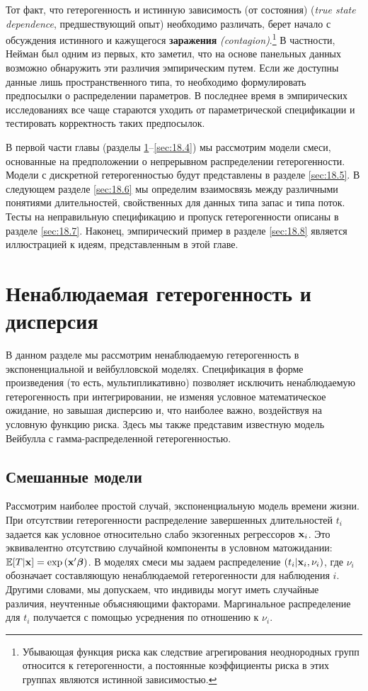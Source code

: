 Тот факт, что гетерогенность и истинную зависимость (от состояния) (\textit{true state dependence}, предшествующий опыт) необходимо различать, берет начало с обсуждения истинного и кажущегося \textbf{заражения} \textit{(contagion)}.\footnote{Убывающая функция риска как следствие агрегирования неоднородных групп относится к гетерогенности, а постоянные коэффициенты риска в этих группах являются истинной зависимостью.} В частности, Нейман был одним из первых, кто заметил, что на основе панельных данных возможно обнаружить эти различия эмпирическим путем. Если же доступны данные лишь пространственного типа, то необходимо формулировать предпосылки о распределении параметров. В последнее время в эмпирических исследованиях все чаще стараются уходить от параметрической спецификации и тестировать корректность таких предпосылок.

В первой части главы (разделы \ref{sec:18.2}--\ref{sec:18.4}) мы рассмотрим модели смеси, основанные на предположении о непрерывном распределении гетерогенности. Модели с дискретной гетерогенностью будут представлены в разделе \ref{sec:18.5}. В следующем разделе \ref{sec:18.6} мы определим взаимосвязь между различными понятиями длительностей, свойственных для данных типа запас и типа поток. Тесты на неправильную спецификацию и пропуск гетерогенности описаны в разделе \ref{sec:18.7}. Наконец, эмпирический пример в разделе \ref{sec:18.8} является иллюстрацией к идеям, представленным в этой главе.




\section{Ненаблюдаемая гетерогенность и дисперсия}
\label{sec:18.2}

\noindent
В данном разделе мы рассмотрим ненаблюдаемую гетерогенность в экспоненциальной и вейбулловской моделях. Спецификация в форме произведения (то есть, мультипликативно) позволяет исключить ненаблюдаемую гетерогенность при интегрировании, не изменяя условное математическое ожидание, но завышая дисперсию и, что наиболее важно, воздействуя на условную функцию риска. Здесь мы также представим известную модель Вейбулла с гамма-распределенной гетерогенностью.


\subsection{Смешанные модели}\label{sec:18.2.1}

\noindent
Рассмотрим наиболее простой случай, экспоненциальную модель времени жизни. При отсутствии гетерогенности распределение завершенных длительностей $t_i$ задается как условное относительно слабо экзогенных регрессоров $\mathbf{x}_i$. Это эквивалентно отсутствию случайной компоненты в условном матожидании: $\mathbb{E}[T|\mathbf{x}]=\exp{(\mathbf{x}'\bm{\beta})}$. В моделях смеси мы задаем распределение $(t_i|\mathbf{x}_i,\nu_i)$, где $\nu_i$ обозначает составляющую ненаблюдаемой гетерогенности для наблюдения $i$. Другими словами, мы допускаем, что индивиды могут иметь случайные различия, неучтенные объясняющими факторами. Маргинальное распределение для $t_i$ получается с помощью усреднения по отношению к $\nu_i$.

